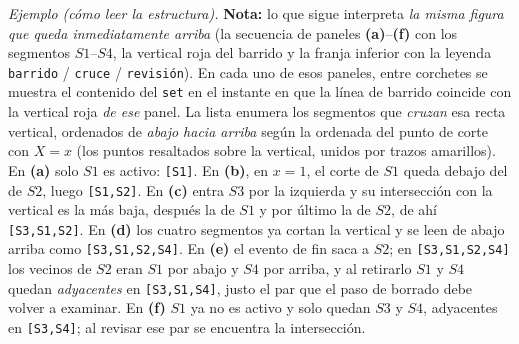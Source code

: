 \textit{Ejemplo (cómo leer la estructura).} \textbf{Nota:} lo que sigue interpreta \emph{la misma figura que queda inmediatamente arriba} (la secuencia de paneles \textbf{(a)}--\textbf{(f)} con los segmentos $S1$--$S4$, la vertical roja del barrido y la franja inferior con la leyenda \texttt{barrido} / \texttt{cruce} / \texttt{revisión}). En cada uno de esos paneles, entre corchetes se muestra el contenido del \texttt{set} en el instante en que la línea de barrido coincide con la vertical roja \emph{de ese} panel. La lista enumera los segmentos que \emph{cruzan} esa recta vertical, ordenados de \emph{abajo hacia arriba} según la ordenada del punto de corte con $X=x$ (los puntos resaltados sobre la vertical, unidos por trazos amarillos). En \textbf{(a)} solo $S1$ es activo: \texttt{[S1]}. En \textbf{(b)}, en $x=1$, el corte de $S1$ queda debajo del de $S2$, luego \texttt{[S1,S2]}. En \textbf{(c)} entra $S3$ por la izquierda y su intersección con la vertical es la más baja, después la de $S1$ y por último la de $S2$, de ahí \texttt{[S3,S1,S2]}. En \textbf{(d)} los cuatro segmentos ya cortan la vertical y se leen de abajo arriba como \texttt{[S3,S1,S2,S4]}. En \textbf{(e)} el evento de fin saca a $S2$; en \texttt{[S3,S1,S2,S4]} los vecinos de $S2$ eran $S1$ por abajo y $S4$ por arriba, y al retirarlo $S1$ y $S4$ quedan \emph{adyacentes} en \texttt{[S3,S1,S4]}, justo el par que el paso de borrado debe volver a examinar. En \textbf{(f)} $S1$ ya no es activo y solo quedan $S3$ y $S4$, adyacentes en \texttt{[S3,S4]}; al revisar ese par se encuentra la intersección.


